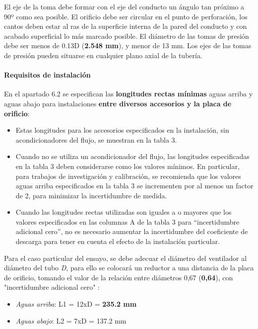El eje de la toma debe formar con el eje del conducto un ángulo tan
próximo a 90º como sea posible. El orificio debe ser circular en el
punto de perforación, los cantos deben estar al ras de la superficie
interna de la pared del conducto y con acabado superficial lo más
marcado posible. El diámetro de las tomas de presión debe ser menos de
0.13D (\textbf{2.548 mm}), y menor de 13 mm. Los ejes de las tomas de
presión pueden situarse en cualquier plano axial de la tubería.

\paragraph{Requisitos de instalación}\label{header-n306}

En el apartado 6.2 se especifican las \textbf{longitudes rectas mínimas}
aguas arriba y aguas abajo para instalaciones \textbf{entre diversos
accesorios y la placa de orificio}:

\begin{itemize}
\item
  Estas longitudes para los accesorios especificados en la instalación,
  sin acondicionadores del flujo, se muestran en la tabla 3.
\item
  Cuando no se utiliza un acondicionador del flujo, las longitudes
  especificadas en la tabla 3 deben considerarse como los valores
  mínimos. En particular, para trabajos de investigación y calibración,
  se recomienda que los valores aguas arriba especificados en la tabla 3
  se incrementen por al menos un factor de 2, para minimizar la
  incertidumbre de medida.
\item
  Cuando las longitudes rectas utilizadas son iguales a o mayores que
  los valores especificados en las columnas A de la tabla 3 para
  ``incertidumbre adicional cero'', no es necesario aumentar la
  incertidumbre del coeficiente de descarga para tener en cuenta el
  efecto de la instalación particular.
\end{itemize}

Para el caso particular del ensayo, se debe adecuar el diámetro del
ventilador al diámetro del tubo \emph{D}, para ello se colocará un
reductor a una distancia de la placa de orificio, tomando el valor de la
relación entre diámetros 0,67 (\textbf{0,64}), con "incertidumbre
adicional cero" :

\begin{itemize}
\item
  \emph{Aguas arriba}: L1 = 12xD = \textbf{235.2 mm}
\item
  \emph{Aguas abajo}: L2 = 7xD = 137.2 mm
\end{itemize}


